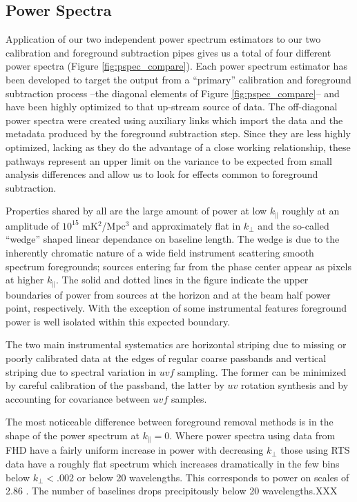 \documentclass[preprint]{aastex}
\begin{document}
\subsection{Power Spectra}
Application of our two independent power spectrum estimators to our two calibration and foreground subtraction pipes gives us a total of four different power spectra (Figure \ref{fig:pspec_compare}).  Each power spectrum estimator has been developed to target the output from a ``primary'' calibration and foreground subtraction process --the diagonal elements of Figure \ref{fig:pspec_compare}-- and have been highly optimized to that up-stream source of data.  The off-diagonal power spectra were created using auxiliary links which import the data and the metadata produced by the foreground subtraction step.  Since they are less highly optimized, lacking as they do the advantage of a close working relationship, these pathways represent an upper limit on the variance to be expected from small analysis differences and allow us to look for effects common to foreground subtraction.


Properties shared by all are the large amount of power at low $k_{\parallel}$ roughly at an amplitude of $10^15$ mK$^2$/Mpc$^3$ and approximately flat in $k_{\perp}$ and the so-called ``wedge'' shaped linear dependance on baseline length.  The wedge is due to the inherently chromatic nature of a wide field instrument scattering smooth spectrum foregrounds; sources entering far from the phase center appear as pixels at higher $k_\parallel$. The solid and dotted lines in the figure indicate the upper boundaries of power from sources at the horizon and at the beam half power point, respectively.  With the exception of some instrumental features foreground power is well isolated within this expected boundary.

The two main instrumental systematics are horizontal striping due to missing or poorly calibrated data at the edges of regular coarse passbands and vertical striping due to spectral variation in $uvf$ sampling. The former can be minimized by careful calibration of the passband, the latter by $uv$ rotation synthesis and by accounting for covariance between $uvf$ samples. 

The most noticeable difference between foreground removal methods is in the shape of the power spectrum at $k_\parallel=0$.  Where power spectra using data from FHD have a fairly uniform increase in power with decreasing $k_\perp$ those using RTS data have a roughly flat spectrum which increases dramatically in the few bins below $k_\perp<.002$ or below 20 wavelengths.  This corresponds to power on scales of 2.86 \arcdeg. The number of baselines drops precipitously below 20 wavelengths.XXX 
\end{document}
